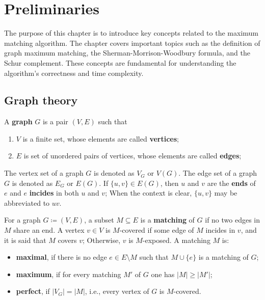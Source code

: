 \renewcommand*{\proofname}{Proof}

\chapter{Preliminaries}

The purpose of this chapter is to introduce key concepts related to the maximum matching algorithm. 
The chapter covers important topics such as the definition of graph maximum matching, the Sherman-Morrison-Woodbury formula, and the Schur complement. 
These concepts are fundamental for understanding the algorithm's correctness and time complexity.

\enlargethispage{.5\baselineskip}

\section{Graph theory}
\label{sec:graph}

\begin{definition}[Graph]
	\label{def:graph}
	A \textbf{graph} \(G\) is a pair \((V, E)\) such that
	\begin{enumerate}[label=(\roman*)]
		\item \(V\) is a finite set, whose elements are called \textbf{vertices};
		\item \(E\) is set of unordered pairs of vertices, whose elements are called \textbf{edges};
	\end{enumerate}
\end{definition}
\noindent
The vertex set of a graph \(G\) is denoted as \(V_G\) or \(V(G)\).
The edge set of a graph \(G\) is denoted as \(E_G\) or \(E(G)\).
If \(\{u,v\} \in E(G)\), then \(u\) and \(v\) are the \textbf{ends} of \(e\) and \(e\) \textbf{incides} in both \(u\) and \(v\);
When the context is clear, \(\{u, v\}\) may be abbreviated to \(uv\).

\begin{definition}[Matching]
	\label{def:matching}
	For a graph \(G \coloneqq (V, E)\), a subset \(M \subseteq E\) is a \textbf{matching} of \(G\) if no two edges in \(M\) share an end.
	A vertex \(v \in V\) is \(M\)-covered if some edge of \(M\) incides in \(v\), 
	and it is said that \(M\) covers \(v\);
	Otherwise, \(v\) is \(M\)-exposed.
	A matching \(M\) is:
	\begin{itemize}
		\item 
			\textbf{maximal}, if there is no edge \(e \in E \setminus M\) such that \(M \cup \{e\}\) is a matching of \(G\);
		\item
			\textbf{maximum}, if for every matching \(M'\) of \(G\) one has \(|M| \geq |M'|\);
		\item
			\textbf{perfect}, if \(|V_G| = |M|\), i.e., every vertex of \(G\) is \(M\)-covered.
	\end{itemize}
\end{definition}


